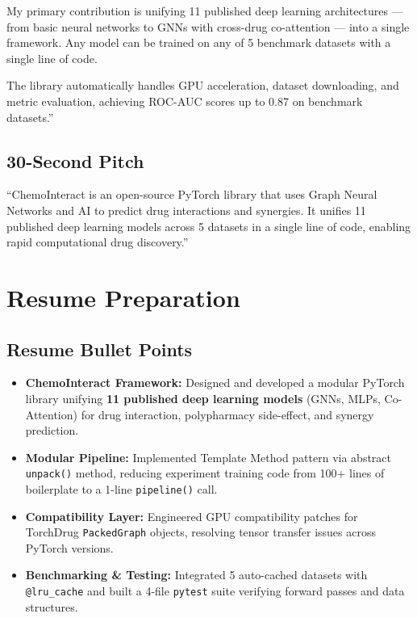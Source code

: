 \documentclass[12pt,a4paper,oneside]{article}
\begin{document}
My primary contribution is unifying 11 published deep learning architectures --- from basic neural networks to GNNs with cross-drug co-attention --- into a single framework. Any model can be trained on any of 5 benchmark datasets with a single line of code.

The library automatically handles GPU acceleration, dataset downloading, and metric evaluation, achieving ROC-AUC scores up to 0.87 on benchmark datasets.''

\subsection{30-Second Pitch}
``ChemoInteract is an open-source PyTorch library that uses Graph Neural Networks and AI to predict drug interactions and synergies. It unifies 11 published deep learning models across 5 datasets in a single line of code, enabling rapid computational drug discovery.''

\section{Resume Preparation}\label{sec:resume}

\subsection{Resume Bullet Points}
\begin{itemize}
  \item \textbf{ChemoInteract Framework:} Designed and developed a modular PyTorch library unifying \textbf{11 published deep learning models} (GNNs, MLPs, Co-Attention) for drug interaction, polypharmacy side-effect, and synergy prediction.
  \item \textbf{Modular Pipeline:} Implemented Template Method pattern via abstract \texttt{unpack()} method, reducing experiment training code from 100+ lines of boilerplate to a 1-line \texttt{pipeline()} call.
  \item \textbf{Compatibility Layer:} Engineered GPU compatibility patches for TorchDrug \texttt{PackedGraph} objects, resolving tensor transfer issues across PyTorch versions.
  \item \textbf{Benchmarking \& Testing:} Integrated 5 auto-cached datasets with \texttt{@lru\_cache} and built a 4-file \texttt{pytest} suite verifying forward passes and data structures.
\end{itemize}
\end{document}
